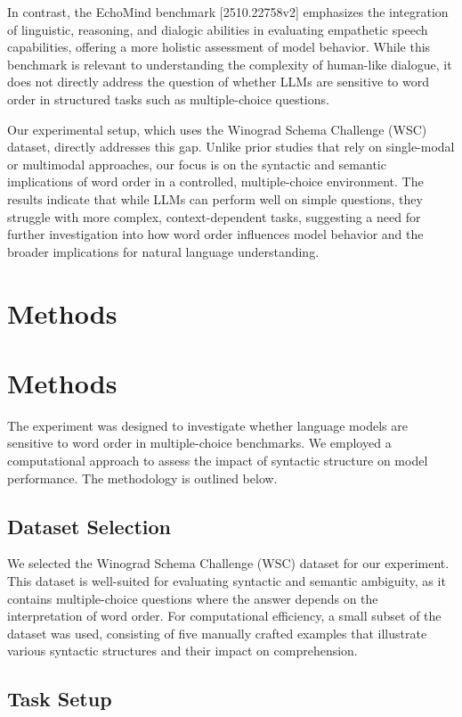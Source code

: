 \documentclass{article}
\begin{document}
In contrast, the EchoMind benchmark [2510.22758v2] emphasizes the integration of linguistic, reasoning, and dialogic abilities in evaluating empathetic speech capabilities, offering a more holistic assessment of model behavior. While this benchmark is relevant to understanding the complexity of human-like dialogue, it does not directly address the question of whether LLMs are sensitive to word order in structured tasks such as multiple-choice questions. 

Our experimental setup, which uses the Winograd Schema Challenge (WSC) dataset, directly addresses this gap. Unlike prior studies that rely on single-modal or multimodal approaches, our focus is on the syntactic and semantic implications of word order in a controlled, multiple-choice environment. The results indicate that while LLMs can perform well on simple questions, they struggle with more complex, context-dependent tasks, suggesting a need for further investigation into how word order influences model behavior and the broader implications for natural language understanding.
\section{Methods}
\section*{Methods}

The experiment was designed to investigate whether language models are sensitive to word order in multiple-choice benchmarks. We employed a computational approach to assess the impact of syntactic structure on model performance. The methodology is outlined below.

\subsection*{Dataset Selection}

We selected the Winograd Schema Challenge (WSC) dataset for our experiment. This dataset is well-suited for evaluating syntactic and semantic ambiguity, as it contains multiple-choice questions where the answer depends on the interpretation of word order. For computational efficiency, a small subset of the dataset was used, consisting of five manually crafted examples that illustrate various syntactic structures and their impact on comprehension.

\subsection*{Task Setup}
\end{document}
